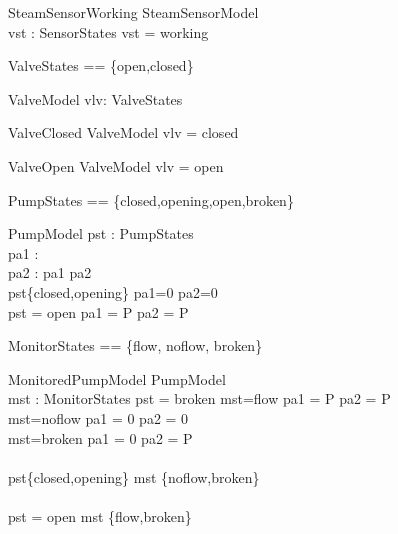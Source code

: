 \begin{schema}{SteamSensorWorking} 
        SteamSensorModel\\
        vst : SensorStates 
\where       
        vst = working
\end{schema}

\begin{zed}
ValveStates == \{open,closed\}
\end{zed}

\begin{schema}{ValveModel}  vlv: ValveStates        \end{schema}
\begin{schema}{ValveClosed} ValveModel       \where vlv = closed \end{schema}
\begin{schema}{ValveOpen}   ValveModel       \where vlv = open   \end{schema}
 
\begin{zed}
PumpStates == \{closed,opening,open,broken\}
\end{zed}
 
\begin{schema}{PumpModel}     
       pst : PumpStates\\
       pa1 : \nat\\
       pa2 : \nat
\where
       pa1 \leq pa2 \\
       pst\in\{closed,opening\} \implies pa1=0 \land pa2=0 \\
       pst = open \implies pa1 = P \land pa2 = P
\end{schema}

\begin{zed}
MonitorStates == \{flow, noflow, broken\} 
\end{zed}

\begin{schema}{MonitoredPumpModel}   
       PumpModel\\ 
       mst : MonitorStates
\where                                   
       pst = broken \implies mst=flow   \implies pa1 = P  \land pa2 = P\\
       mst=noflow \implies pa1 = 0 \land pa2 = 0  \\
       mst=broken \implies pa1 = 0 \land pa2 = P   \\
\\
       pst\in\{closed,opening\} \implies mst \in \{noflow,broken\} \\
\\
       pst = open \implies mst \in \{flow,broken\}
\end{schema}   


